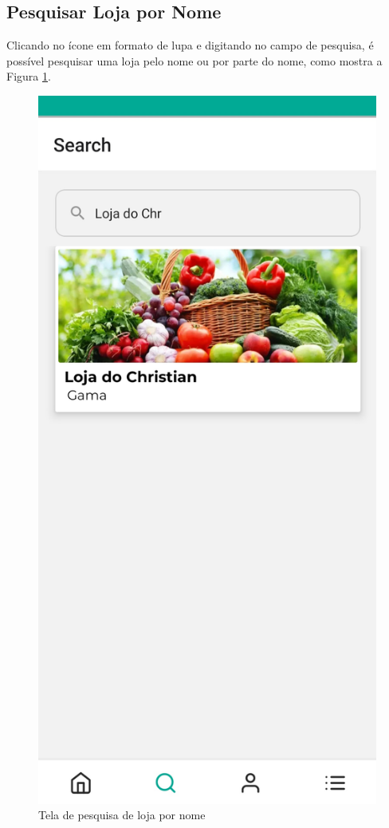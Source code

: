 \subsection{Pesquisar Loja por Nome}
Clicando no ícone em formato de lupa e digitando no campo de pesquisa, é possível pesquisar uma loja pelo nome ou por parte do nome, como mostra a Figura \ref{tela-pesquisa-loja-nome-app}.

\begin{figure}[h]
	\centering
	\includegraphics[keepaspectratio=true,scale=0.16]{figuras/filtra_loja_nome.jpg}
	\caption{Tela de pesquisa de loja por nome}
        \label{tela-pesquisa-loja-nome-app}
\end{figure}

